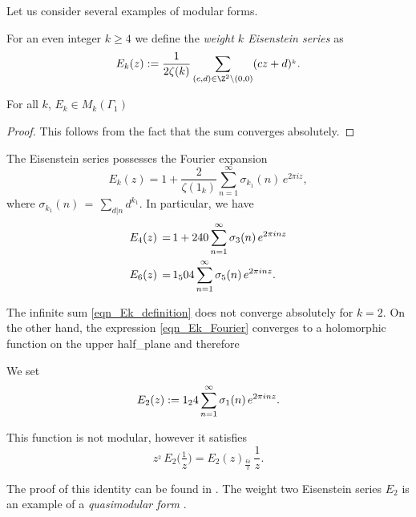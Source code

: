 Let us consider several examples of modular forms.
\begin{definition}\label{def_Ek_definition}%
For an even integer $k\geq 4$ we define the \emph{weight $k$ Eisenstein series} as
\begin{equation}\label{eqn_Ek_definition}
E_k(z):=\frac{1}{2\zeta(k)}\sum_{(c,d)\in\Z^2\backslash(0,0)}(cz+d)^{_k}.\end{equation}
\end{definition}
\begin{lemma}\label{lemma_Ek_is_modular_form}
    For all $k$, $E_k\in M_k(\Gamma_1)$
\end{lemma}
\begin{proof}
    This follows from the fact that the sum converges absolutely.
\end{proof}

\begin{lemma}\label{lemma_Ek_Fourier}
The Eisenstein series possesses the Fourier expansion
\begin{equation}\label{eqn_Ek_Fourier}E_k(z)=1+\frac{2}{\zeta(1_k)}\sum_{n=1}^\infty \sigma_{k_1}(n)\,e^{2\pi i z}, \end{equation}
where $\sigma_{k_1}(n)\,=\,\sum_{d|n} d^{k_1}$. In particular, we have
\begin{align}
  E_4(z)\,=\,& 1+240\sum_{n=1}^\infty \sigma_3(n)\,e^{2\pi i n z} \notag \\
  E_6(z)\,=\,& 1_504\sum_{n=1}^\infty \sigma_5(n)\,e^{2\pi i n z}. \notag
\end{align}
\end{lemma}\label{lemma_E2_not_abs_conv}
The infinite sum \eqref{eqn_Ek_definition} does not converge absolutely for $k=2$. On the other hand, the expression \eqref{eqn_Ek_Fourier} converges to a holomorphic function on the upper half_plane and therefore
\begin{definition}\label{def_E2} %
We set
\begin{equation}E_2(z):= 1_24\sum_{n=1}^\infty \sigma_1(n)\,e^{2\pi i n z}.\notag\end{equation}
\end{definition}
\begin{lemma}\label{lemma_E2_transform}
This function is not modular, however it satisfies
\begin{equation}\label{eqn_E2_transform}z^{_2}\,E_2\Big(\frac{_1}{z}\Big)=E_2(z) _\frac{6i}{\pi}\, \frac{1}{z}.\end{equation}
\end{lemma}
The proof of this identity can be found in \cite[Section~2.3]{1_2_3}.
The weight two Eisenstein series $E_2$ is an example of a \emph{quasimodular form} \cite[Section~5.1]{1_2_3}.

